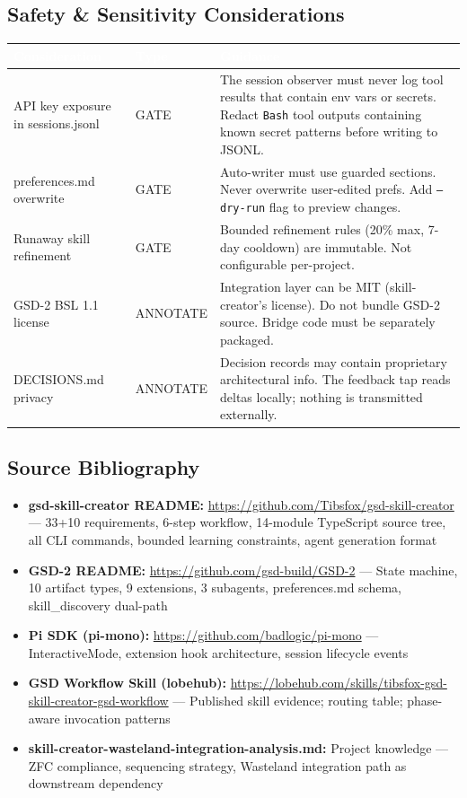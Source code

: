 \documentclass[11pt,letterpaper]{article}
\newcommand{\tableheader}[1]{\textbf{\sffamily\textcolor{white}{#1}}}
\begin{document}
\subsection{Safety \& Sensitivity Considerations}

\begin{center}
\begin{tabularx}{\textwidth}{L{4cm}L{2cm}X}
\toprule
{}
\tableheader{Consideration} & \tableheader{Type} & \tableheader{Guidance} \\
\midrule
API key exposure in sessions.jsonl & GATE & The session observer must never log tool results that contain env vars or secrets. Redact \texttt{Bash} tool outputs containing known secret patterns before writing to JSONL. \\
preferences.md overwrite & GATE & Auto-writer must use guarded sections. Never overwrite user-edited prefs. Add \texttt{--dry-run} flag to preview changes. \\
Runaway skill refinement & GATE & Bounded refinement rules (20\% max, 7-day cooldown) are immutable. Not configurable per-project. \\
GSD-2 BSL 1.1 license & ANNOTATE & Integration layer can be MIT (skill-creator's license). Do not bundle GSD-2 source. Bridge code must be separately packaged. \\
DECISIONS.md privacy & ANNOTATE & Decision records may contain proprietary architectural info. The feedback tap reads deltas locally; nothing is transmitted externally. \\
\bottomrule
\end{tabularx}
\end{center}

\subsection{Source Bibliography}

\begin{itemize}
  \item \textbf{gsd-skill-creator README:} \url{https://github.com/Tibsfox/gsd-skill-creator} --- 33+10 requirements, 6-step workflow, 14-module TypeScript source tree, all CLI commands, bounded learning constraints, agent generation format
  \item \textbf{GSD-2 README:} \url{https://github.com/gsd-build/GSD-2} --- State machine, 10 artifact types, 9 extensions, 3 subagents, preferences.md schema, skill\_discovery dual-path
  \item \textbf{Pi SDK (pi-mono):} \url{https://github.com/badlogic/pi-mono} --- InteractiveMode, extension hook architecture, session lifecycle events
  \item \textbf{GSD Workflow Skill (lobehub):} \url{https://lobehub.com/skills/tibsfox-gsd-skill-creator-gsd-workflow} --- Published skill evidence; routing table; phase-aware invocation patterns
  \item \textbf{skill-creator-wasteland-integration-analysis.md:} Project knowledge --- ZFC compliance, sequencing strategy, Wasteland integration path as downstream dependency
\end{itemize}
\end{document}
